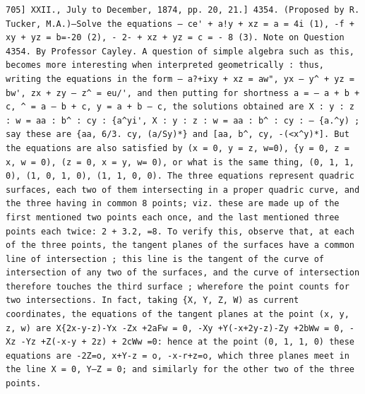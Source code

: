 \documentclass[12pt]{article}
\theoremstyle{plain}
\begin{document}
\newpage
\setcounter{page}{581}
\begin{verbatim}
705] XXII., July to December, 1874, pp. 20, 21.] 4354. (Proposed by R. Tucker, M.A.)—Solve the equations — ce' + a!y + xz = a = 4i (1), -f + xy + yz = b=-20 (2), - 2- + xz + yz = c = - 8 (3). Note on Question 4354. By Professor Cayley. A question of simple algebra such as this, becomes more interesting when interpreted geometrically : thus, writing the equations in the form — a?+ixy + xz = aw", yx — y^ + yz = bw', zx + zy — z^ = eu/', and then putting for shortness a = — a + b + c, ^ = a — b + c, y = a + b — c, the solutions obtained are X : y : z : w = aa : b^ : cy : {a^yi', X : y : z : w = aa : b^ : cy : — {a.^y) ; say these are {aa, 6/3. cy, (a/Sy)*} and [aa, b^, cy, -(<x^y)*]. But the equations are also satisfied by (x = 0, y = z, w=0), {y = 0, z = x, w = 0), (z = 0, x = y, w= 0), or what is the same thing, (0, 1, 1, 0), (1, 0, 1, 0), (1, 1, 0, 0). The three equations represent quadric surfaces, each two of them intersecting in a proper quadric curve, and the three having in common 8 points; viz. these are made up of the first mentioned two points each once, and the last mentioned three points each twice: 2 + 3.2, =8. To verify this, observe that, at each of the three points, the tangent planes of the surfaces have a common line of intersection ; this line is the tangent of the curve of intersection of any two of the surfaces, and the curve of intersection therefore touches the third surface ; wherefore the point counts for two intersections. In fact, taking {X, Y, Z, W) as current coordinates, the equations of the tangent planes at the point (x, y, z, w) are X{2x-y-z)-Yx -Zx +2aFw = 0, -Xy +Y(-x+2y-z)-Zy +2bWw = 0, -Xz -Yz +Z(-x-y + 2z) + 2cWw =0: hence at the point (0, 1, 1, 0) these equations are -2Z=o, x+Y-z = o, -x-r+z=o, which three planes meet in the line X = 0, Y—Z = 0; and similarly for the other two of the three points. 
\end{verbatim}
\end{document}
